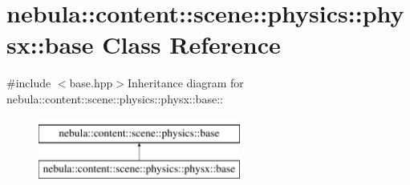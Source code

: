 \hypertarget{classnebula_1_1content_1_1scene_1_1physics_1_1physx_1_1base}{
\section{nebula::content::scene::physics::physx::base Class Reference}
\label{classnebula_1_1content_1_1scene_1_1physics_1_1physx_1_1base}
}


{\ttfamily \#include $<$base.hpp$>$}Inheritance diagram for nebula::content::scene::physics::physx::base::\begin{figure}[H]
\begin{center}
\leavevmode
\includegraphics[height=2cm]{classnebula_1_1content_1_1scene_1_1physics_1_1physx_1_1base}
\end{center}
\end{figure}
